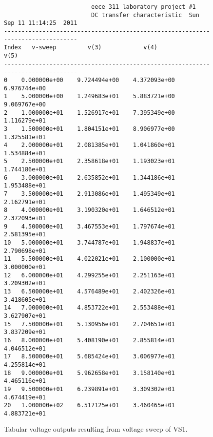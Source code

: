 \documentclass{article}
\begin{document}
\begin{figure}
{\footnotesize
\begin{verbatim}
                         eece 311 laboratory project #1
                         DC transfer characteristic  Sun Sep 11 11:14:25  2011
--------------------------------------------------------------------------------
Index   v-sweep         v(3)            v(4)            v(5)            
--------------------------------------------------------------------------------
0    0.000000e+00    9.724494e+00    4.372093e+00    6.976744e+00    
1    5.000000e+00    1.249683e+01    5.883721e+00    9.069767e+00    
2    1.000000e+01    1.526917e+01    7.395349e+00    1.116279e+01    
3    1.500000e+01    1.804151e+01    8.906977e+00    1.325581e+01    
4    2.000000e+01    2.081385e+01    1.041860e+01    1.534884e+01    
5    2.500000e+01    2.358618e+01    1.193023e+01    1.744186e+01    
6    3.000000e+01    2.635852e+01    1.344186e+01    1.953488e+01    
7    3.500000e+01    2.913086e+01    1.495349e+01    2.162791e+01    
8    4.000000e+01    3.190320e+01    1.646512e+01    2.372093e+01    
9    4.500000e+01    3.467553e+01    1.797674e+01    2.581395e+01    
10   5.000000e+01    3.744787e+01    1.948837e+01    2.790698e+01    
11   5.500000e+01    4.022021e+01    2.100000e+01    3.000000e+01    
12   6.000000e+01    4.299255e+01    2.251163e+01    3.209302e+01    
13   6.500000e+01    4.576489e+01    2.402326e+01    3.418605e+01    
14   7.000000e+01    4.853722e+01    2.553488e+01    3.627907e+01    
15   7.500000e+01    5.130956e+01    2.704651e+01    3.837209e+01    
16   8.000000e+01    5.408190e+01    2.855814e+01    4.046512e+01    
17   8.500000e+01    5.685424e+01    3.006977e+01    4.255814e+01    
18   9.000000e+01    5.962658e+01    3.158140e+01    4.465116e+01    
19   9.500000e+01    6.239891e+01    3.309302e+01    4.674419e+01    
20   1.000000e+02    6.517125e+01    3.460465e+01    4.883721e+01    
\end{verbatim}
}
\caption{Tabular voltage outputs resulting from voltage sweep of VS1.}
\label{fig:spicevolt}
\end{figure}
\end{document}
